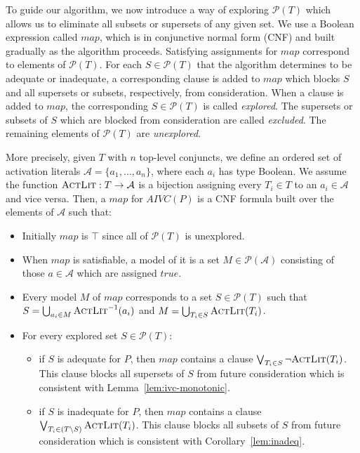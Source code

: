 To guide our algorithm, we now introduce a way of exploring
$\mathcal{P}(T)$ which allows us to eliminate all subsets or supersets
of any given set. We use a Boolean expression called $map$, which is
in conjunctive normal form (CNF) and built gradually as the algorithm
proceeds. Satisfying assignments for $map$ correspond to elements of
$\mathcal{P}(T)$. For each $S \in \mathcal{P}(T)$ that the algorithm
determines to be adequate or inadequate, a corresponding clause is
added to $map$ which blocks $S$ and all supersets or subsets,
respectively, from consideration. When a clause is added to $map$, the
corresponding $S \in \mathcal{P}(T)$ is called \emph{explored}.
The supersets or subsets of $S$ which are blocked from
consideration are called \emph{excluded}. The remaining elements
of $\mathcal{P}(T)$ are \emph{unexplored}.

More precisely, given $T$ with $n$ top-level conjuncts, we define an
ordered set of activation literals $\mathcal{A} = \{a_1, \ldots,
a_n\}$, where each $a_i$ has type Boolean. We assume the function
$\textsc{ActLit} : T \rightarrow \mathcal{A}$ is a bijection assigning every
$T_i \in T$ to an $a_i \in \mathcal{A}$ and vice versa. Then, a $map$
for $AIVC(P)$ is a CNF formula built over the elements of
$\mathcal{A}$ such that:
\begin{itemize}
  \item Initially $map$ is $\top$ since all of $\mathcal{P}(T)$ is unexplored.

  \item When $map$ is satisfiable, a model of it is a set
  $M \in \mathcal{P}(\mathcal{A})$ consisting of those $a \in
    \mathcal{A}$ which are assigned $true$.

  \item Every model $M$ of $map$ corresponds to a set $S \in \mathcal{P}(T)$ such that
$S = \bigcup_{a_i \in M} \textsc{ActLit} ^{-1} (a_i)$ and $M = \bigcup_{T_i \in S} \textsc{ActLit}(T_i)$.
\vspace{0.05in}
  \item For every explored set $S \in \mathcal{P}(T)$:
  \begin{itemize}
    \item if $S$ is adequate for $P$, then $map$ contains a clause
      $\bigvee_{T_{i}\in S} \neg {\textsc{ActLit}(T_i)}$. This clause blocks
      all supersets of $S$ from future consideration which is
      consistent with Lemma~\ref{lem:ivc-monotonic}.

    \item if $S$ is inadequate for $P$, then $map$ contains a clause
      $\bigvee_{T_{i}\in (T \setminus S)} \textsc{ActLit} (T_i)$. This clause
      blocks all subsets of $S$ from future consideration which is
      consistent with Corollary~\ref{lem:inadeq}.
  \end{itemize}
\end{itemize}


